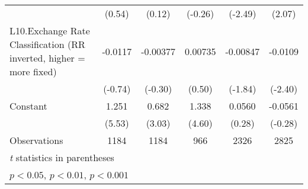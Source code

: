 {\begin{longtable}{l*{5}{c}}
                &   (0.54)         &   (0.12)         &  (-0.26)         &  (-2.49)         &   (2.07)         \\
[1em]
L10.Exchange Rate Classification (RR inverted, higher = more fixed)&  -0.0117         & -0.00377         &  0.00735         & -0.00847         &  -0.0109\sym{*}  \\
                &  (-0.74)         &  (-0.30)         &   (0.50)         &  (-1.84)         &  (-2.40)         \\
[1em]
Constant        &    1.251\sym{***}&    0.682\sym{**} &    1.338\sym{***}&   0.0560         &  -0.0561         \\
                &   (5.53)         &   (3.03)         &   (4.60)         &   (0.28)         &  (-0.28)         \\
\hline
Observations    &     1184         &     1184         &      966         &     2326         &     2825         \\
\hline\hline
\multicolumn{6}{l}{\footnotesize \textit{t} statistics in parentheses}\\
\multicolumn{6}{l}{\footnotesize \sym{*} \(p<0.05\), \sym{**} \(p<0.01\), \sym{***} \(p<0.001\)}\\
\end{longtable}
}

